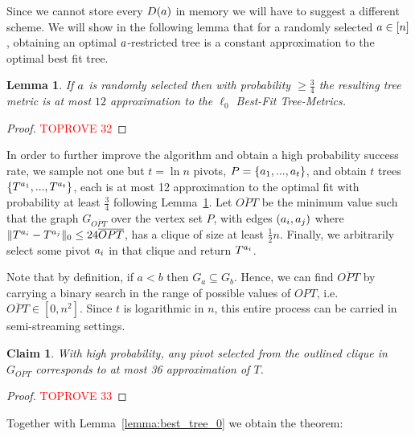 \documentclass{article}
\newtheorem{claim}[theorem]{Claim}
\newtheorem{lemma}[theorem]{Lemma}
\begin{document}
Since we cannot store every $D(a)$ in memory we will have to suggest a different scheme.
We will show in the following lemma that for a randomly selected $a \in [n]$, obtaining an optimal  $a$-restricted tree is a constant approximation to the optimal best fit tree.

\begin{lemma}\label{lemma:l0_pivot}
If $a$ is randomly selected then with probability $\geq \frac{3}{4}$ the resulting tree metric is at most $12$ approximation to the $\ell_0$ Best-Fit Tree-Metrics.
\end{lemma}

\begin{proof}\textcolor{red}{TOPROVE 32}\end{proof}

In order to further improve the algorithm and obtain a high probability success rate, we sample not one but $t=\ln n$ pivots, $P=\{a_1,...,a_t \}$, and obtain $t$ trees $\{T^{a_1},...,T^{a_t}\}$, each is at most 12 approximation to the optimal fit with probability at least $\frac{3}{4}$ following Lemma~\ref{lemma:l0_pivot}. 
Let $\overline{OPT}$ be the minimum value such that the graph $G_{\overline{OPT}}$ over the vertex set $P$, with edges $(a_i,a_j)$ where $\lVert T^{a_i}-T^{a_j} \rVert_0 \leq 24\overline{OPT}$, has a clique of size at least $\frac{1}{2}n$. Finally, we arbitrarily select some pivot $a_i$ in that clique and return $T^{a_i}$.

Note that by definition, if $a<b$ then $G_a \subseteq G_b$. Hence, we can find $\overline{OPT}$ by carrying a binary search in the range of possible values of $OPT$, i.e. $\overline{OPT} \in [0,n^2]$. Since $t$ is logarithmic in $n$, this entire process can be carried in semi-streaming settings.

\begin{claim}
With high probability, any pivot selected from the outlined clique in $G_{\overline{OPT}}$ corresponds to at most 36 approximation of $T$.
\end{claim}

\begin{proof}\textcolor{red}{TOPROVE 33}\end{proof}

Together with Lemma~\ref{lemma:best_tree_0} we obtain the theorem:

\zeroreduction*
 


\end{document}
